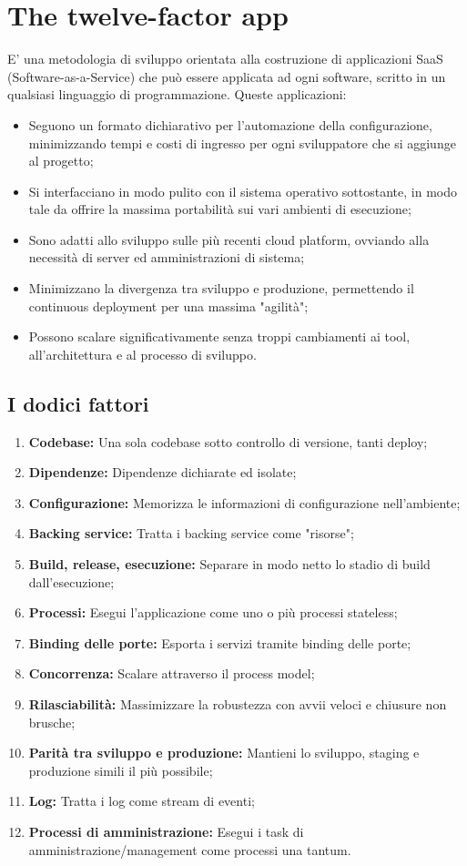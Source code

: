 \documentclass[PianoDiQualifica.tex]{subfiles}
\begin{document}
\appendix
\chapter{The twelve-factor app}
E' una metodologia di sviluppo orientata alla costruzione di applicazioni SaaS (Software-as-a-Service) che può essere applicata ad ogni software, scritto in un qualsiasi linguaggio di programmazione.
Queste applicazioni:
\begin{itemize}
\item Seguono un formato dichiarativo per l'automazione della configurazione, minimizzando tempi e costi di ingresso per ogni sviluppatore che si aggiunge al progetto;
\item Si interfacciano in modo pulito con il sistema operativo sottostante, in modo tale da offrire la massima portabilità sui vari ambienti di esecuzione;
\item Sono adatti allo sviluppo sulle più recenti cloud platform, ovviando alla necessità di server ed amministrazioni di sistema;
\item Minimizzano la divergenza tra sviluppo e produzione, permettendo il continuous deployment per una massima "agilità";
\item Possono scalare significativamente senza troppi cambiamenti ai tool, all'architettura e al processo di sviluppo.
\end{itemize}

\section{I dodici fattori}
\begin{enumerate}
\item \textbf{Codebase:} Una sola codebase sotto controllo di versione, tanti deploy;
\item \textbf{Dipendenze:} Dipendenze dichiarate ed isolate;
\item \textbf{Configurazione:} Memorizza le informazioni di configurazione nell'ambiente;
\item \textbf{Backing service:} Tratta i backing service come "risorse";
\item \textbf{Build, release, esecuzione:} Separare in modo netto lo stadio di build dall'esecuzione;
\item \textbf{Processi:} Esegui l'applicazione come uno o più processi stateless;
\item \textbf{Binding delle porte:} Esporta i servizi tramite binding delle porte;
\item \textbf{Concorrenza:} Scalare attraverso il process model;
\item \textbf{Rilasciabilità:} Massimizzare la robustezza con avvii veloci e chiusure non brusche;
\item \textbf{Parità tra sviluppo e produzione:} Mantieni lo sviluppo, staging e produzione simili il più possibile;
\item \textbf{Log:} Tratta i log come stream di eventi;
\item \textbf{Processi di amministrazione:} Esegui i task di amministrazione/management come processi una tantum.
\end{enumerate}
\end{document}
